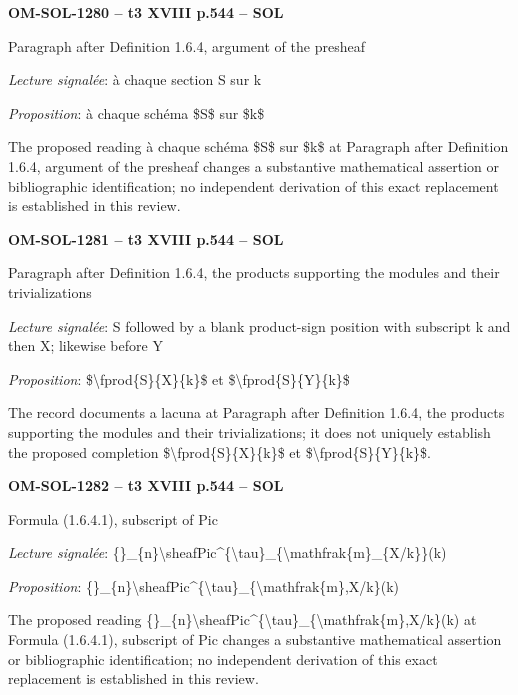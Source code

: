 \par\noindent\textbf{OM-SOL-1280 -- t3 XVIII p.544 -- SOL}\par
Paragraph after Definition 1.6.4, argument of the presheaf\par
\emph{Lecture signalée}: à chaque section S sur k\par
\emph{Proposition}: à chaque schéma \$S\$ sur \$k\$\par
The proposed reading à chaque schéma \$S\$ sur \$k\$ at Paragraph after Definition 1.6.4, argument of the presheaf changes a substantive mathematical assertion or bibliographic identification; no independent derivation of this exact replacement is established in this review.\par
\par\noindent\textbf{OM-SOL-1281 -- t3 XVIII p.544 -- SOL}\par
Paragraph after Definition 1.6.4, the products supporting the modules and their trivializations\par
\emph{Lecture signalée}: S followed by a blank product-sign position with subscript k and then X; likewise before Y\par
\emph{Proposition}: \$\textbackslash{}fprod\{S\}\{X\}\{k\}\$ et \$\textbackslash{}fprod\{S\}\{Y\}\{k\}\$\par
The record documents a lacuna at Paragraph after Definition 1.6.4, the products supporting the modules and their trivializations; it does not uniquely establish the proposed completion \$\textbackslash{}fprod\{S\}\{X\}\{k\}\$ et \$\textbackslash{}fprod\{S\}\{Y\}\{k\}\$.\par
\par\noindent\textbf{OM-SOL-1282 -- t3 XVIII p.544 -- SOL}\par
Formula (1.6.4.1), subscript of Pic\par
\emph{Lecture signalée}: \{\}\_\{n\}\textbackslash{}sheafPic\textasciicircum{}\{\textbackslash{}tau\}\_\{\textbackslash{}mathfrak\{m\}\_\{X/k\}\}(k)\par
\emph{Proposition}: \{\}\_\{n\}\textbackslash{}sheafPic\textasciicircum{}\{\textbackslash{}tau\}\_\{\textbackslash{}mathfrak\{m\},X/k\}(k)\par
The proposed reading \{\}\_\{n\}\textbackslash{}sheafPic\textasciicircum{}\{\textbackslash{}tau\}\_\{\textbackslash{}mathfrak\{m\},X/k\}(k) at Formula (1.6.4.1), subscript of Pic changes a substantive mathematical assertion or bibliographic identification; no independent derivation of this exact replacement is established in this review.\par
